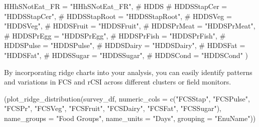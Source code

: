 \documentclass[
  letterpaper,
  DIV=11,
  numbers=noendperiod]{scrreprt}
\newenvironment{Shaded}{\begin{snugshade}}{\end{snugshade}}
\newcommand{\AttributeTok}[1]{\textcolor[rgb]{0.40,0.45,0.13}{#1}}
\newcommand{\CommentTok}[1]{\textcolor[rgb]{0.37,0.37,0.37}{#1}}
\newcommand{\FunctionTok}[1]{\textcolor[rgb]{0.28,0.35,0.67}{#1}}
\newcommand{\NormalTok}[1]{\textcolor[rgb]{0.00,0.23,0.31}{#1}}
\newcommand{\StringTok}[1]{\textcolor[rgb]{0.13,0.47,0.30}{#1}}
\begin{document}
\begin{Shaded}
\begin{Highlighting}[]
                                 \AttributeTok{HHhSNotEat\_FR =} \StringTok{"HHhSNotEat\_FR"}\NormalTok{, }
                                 \CommentTok{\# HDDS}
                                 \CommentTok{\# HDDSStapCer = "HDDSStapCer", }
                                 \CommentTok{\# HDDSStapRoot = "HDDSStapRoot", }
                                 \CommentTok{\# HDDSVeg = "HDDSVeg", }
                                 \CommentTok{\# HDDSFruit = "HDDSFruit", }
                                 \CommentTok{\# HDDSPrMeat = "HDDSPrMeat", }
                                 \CommentTok{\# HDDSPrEgg = "HDDSPrEgg", }
                                 \CommentTok{\# HDDSPrFish = "HDDSPrFish", }
                                 \CommentTok{\# HDDSPulse = "HDDSPulse", }
                                 \CommentTok{\# HDDSDairy = "HDDSDairy", }
                                 \CommentTok{\# HDDSFat = "HDDSFat", }
                                 \CommentTok{\# HDDSSugar = "HDDSSugar", }
                                 \CommentTok{\# HDDSCond = "HDDSCond"}
\NormalTok{                                 )}
\end{Highlighting}
\end{Shaded}

By incorporating ridge charts into your analysis, you can easily
identify patterns and variations in FCS and rCSI across different
clusters or field monitors.

\begin{Shaded}
\begin{Highlighting}[]
\NormalTok{(}\FunctionTok{plot\_ridge\_distribution}\NormalTok{(survey\_df, }\AttributeTok{numeric\_cols =} \FunctionTok{c}\NormalTok{(}\StringTok{"FCSStap"}\NormalTok{, }\StringTok{"FCSPulse"}\NormalTok{, }\StringTok{"FCSPr"}\NormalTok{, }\StringTok{"FCSVeg"}\NormalTok{, }\StringTok{"FCSFruit"}\NormalTok{, }\StringTok{"FCSDairy"}\NormalTok{, }\StringTok{"FCSFat"}\NormalTok{, }\StringTok{"FCSSugar"}\NormalTok{),}
                         \AttributeTok{name\_groups =} \StringTok{"Food Groups"}\NormalTok{, }\AttributeTok{name\_units =} \StringTok{"Days"}\NormalTok{, }\AttributeTok{grouping =} \StringTok{"EnuName"}\NormalTok{))}
\end{Highlighting}
\end{Shaded}
\end{document}
